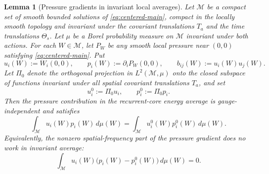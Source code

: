 \documentclass[11pt]{amsart}
\numberwithin{equation}{section}
\theoremstyle{plain}
\newtheorem{lemma}[lemma]{Lemma}
\theoremstyle{definition}
\theoremstyle{remark}
\newcommand{\calM}{\mathcal M}
\begin{document}
\begin{lemma}[Pressure gradients in invariant local averages]
\label{lem:recurrent-core-pressure-gauges}
Let \(\calM\) be a compact set of smooth bounded solutions of
\eqref{eq:centered-main}, compact in the locally smooth topology and invariant
under the covariant translations \(T_a\) and the time translations
\(\Theta_s\).  Let \(\mu\) be a Borel probability measure on \(\calM\)
invariant under both actions.  For each \(W\in\calM\), let \(P_W\) be any
smooth local pressure near \((0,0)\) satisfying \eqref{eq:centered-main}.  Put
\[
   u_i(W):=W_i(0,0),
   \qquad
   p_i(W):=\partial_iP_W(0,0),
   \qquad
   b_{ij}(W):=u_i(W)u_j(W).
\]
Let \(\Pi_0\) denote the orthogonal projection in
\(L^2(\calM,\mu)\) onto the closed subspace of functions invariant under all
spatial covariant translations \(T_a\), and set
\[
   u_i^0:=\Pi_0u_i,\qquad p_i^0:=\Pi_0p_i.
\]
Then the pressure contribution in the recurrent-core energy average is
gauge-independent and satisfies
\begin{equation}\label{eq:pressure-average-core}
   \int_{\calM}u_i(W)p_i(W)\,d\mu(W)
   =
   \int_{\calM}u_i^0(W)p_i^0(W)\,d\mu(W).
\end{equation}
Equivalently, the nonzero spatial-frequency part of the pressure gradient
does no work in invariant average:
\begin{equation}\label{eq:pressure-nonzero-modes-core}
   \int_{\calM}u_i(W)\bigl(p_i(W)-p_i^0(W)\bigr)\,d\mu(W)=0 .
\end{equation}
\end{lemma}
\end{document}
